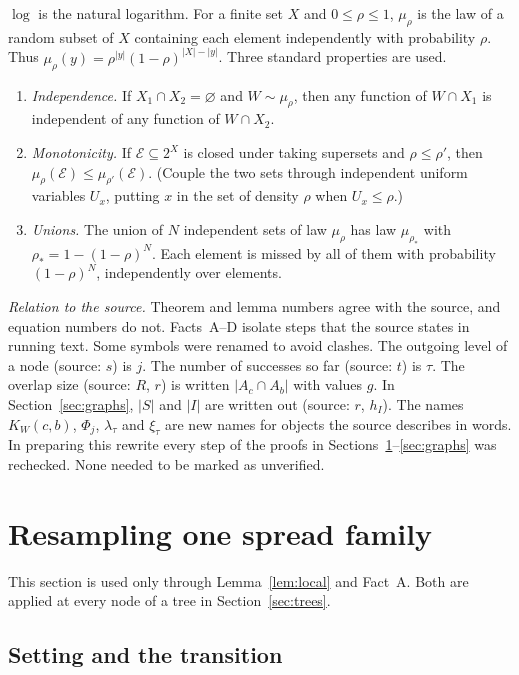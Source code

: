 \documentclass[11pt]{article}
\numberwithin{equation}{section}
\begin{document}
$\log$ is the natural logarithm. For a finite set $X$ and
$0\le\rho\le1$, $\mu_\rho$ is the law of a random subset of $X$
containing each element independently with probability $\rho$. Thus
$\mu_\rho(y)=\rho^{|y|}(1-\rho)^{|X|-|y|}$. Three standard properties
are used.
\begin{enumerate}[label=(P\arabic*),leftmargin=2.8em,itemsep=2pt]
 \item \emph{Independence.} If $X_1\cap X_2=\varnothing$ and
 $W\sim\mu_\rho$, then any function of $W\cap X_1$ is independent of
 any function of $W\cap X_2$.
 \item \emph{Monotonicity.} If $\mathcal E\subseteq2^X$ is closed under
 taking supersets and $\rho\le\rho'$, then
 $\mu_\rho(\mathcal E)\le\mu_{\rho'}(\mathcal E)$. (Couple the two
 sets through independent uniform variables $U_x$, putting $x$ in the
 set of density $\rho$ when $U_x\le\rho$.)
 \item \emph{Unions.} The union of $N$ independent sets of law
 $\mu_\rho$ has law $\mu_{\rho_*}$ with $\rho_*=1-(1-\rho)^N$. Each
 element is missed by all of them with probability $(1-\rho)^N$,
 independently over elements.
\end{enumerate}

\emph{Relation to the source.} Theorem and lemma numbers agree with the
source, and equation numbers do not. Facts~A--D isolate steps that the
source states in running text. Some symbols were renamed to avoid
clashes. The outgoing level of a node (source: $s$) is $j$. The number
of successes so far (source: $t$) is $\tau$. The overlap size (source:
$R$, $r$) is written $|A_c\cap A_b|$ with values $g$. In
Section~\ref{sec:graphs}, $|S|$ and $|I|$ are written out (source: $r$,
$h_I$). The names $K_W(c,b)$, $\Phi_j$, $\lambda_\tau$ and $\xi_\tau$
are new names for objects the source describes in words. In preparing
this rewrite every step of the proofs in
Sections~\ref{sec:resampling}--\ref{sec:graphs} was rechecked. None
needed to be marked as unverified.

\section{Resampling one spread family}\label{sec:resampling}

This section is used only through Lemma~\ref{lem:local} and Fact~A.
Both are applied at every node of a tree in Section~\ref{sec:trees}.

\subsection{Setting and the transition}
\end{document}
